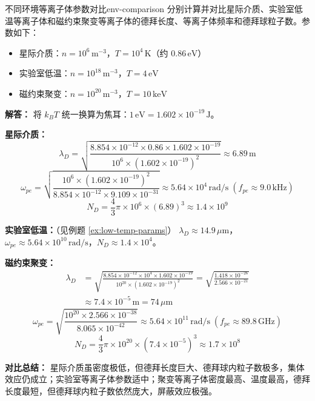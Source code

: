 \begin{example}{不同环境等离子体参数对比}{env-comparison}
分别计算并对比星际介质、实验室低温等离子体和磁约束聚变等离子体的德拜长度、等离子体频率和德拜球粒子数。参数如下：
\begin{itemize}[leftmargin=*,itemsep=0pt]
\item 星际介质：$n = 10^{6}\,\mathrm{m}^{-3}$，$T = 10^{4}\,\mathrm{K}$（约 $0.86\,\mathrm{eV}$）
\item 实验室低温：$n = 10^{18}\,\mathrm{m}^{-3}$，$T = 4\,\mathrm{eV}$
\item 磁约束聚变：$n = 10^{20}\,\mathrm{m}^{-3}$，$T = 10\,\mathrm{keV}$
\end{itemize}
\tcblower
\textbf{解答：}
将 $k_{\!B}T$ 统一换算为焦耳：$1\,\mathrm{eV}=1.602\times 10^{-19}\,\mathrm{J}$。

\textbf{星际介质：}
\[
\lambda_D = \sqrt{\frac{8.854\times 10^{-12}\times 0.86\times 1.602\times 10^{-19}}{10^6\times (1.602\times 10^{-19})^2}} \approx 6.89\,\mathrm{m}
\]
\[
\omega_{pe} = \sqrt{\frac{10^6\times (1.602\times 10^{-19})^2}{8.854\times 10^{-12}\times 9.109\times 10^{-31}}} \approx 5.64\times 10^{4}\,\mathrm{rad/s}\;(f_{pe}\approx 9.0\,\mathrm{kHz})
\]
\[
N_D = \frac{4}{3}\pi\times 10^6\times (6.89)^3 \approx 1.4\times 10^{9}
\]

\textbf{实验室低温：}（见例题 \ref{ex:low-temp-params}）
$\lambda_D\approx 14.9\,\mu\mathrm{m}$，$\omega_{pe}\approx 5.64\times 10^{10}\,\mathrm{rad/s}$，$N_D\approx 1.4\times 10^4$。

\textbf{磁约束聚变：}
\[
\begin{aligned}
\lambda_D &= \sqrt{\frac{8.854\times 10^{-12}\times 10^4\times 1.602\times 10^{-19}}
                        {10^{20}\times (1.602\times 10^{-19})^2}}
          = \sqrt{\frac{1.418\times 10^{-26}}{2.566\times 10^{-21}}} \\
          &\approx 7.4\times 10^{-5}\,\mathrm{m} = 74\,\mu\mathrm{m}
\end{aligned}
\]
\[
\omega_{pe} = \sqrt{\frac{10^{20}\times 2.566\times 10^{-38}}{8.065\times 10^{-42}}} \approx 5.64\times 10^{11}\,\mathrm{rad/s}\;(f_{pe}\approx 89.8\,\mathrm{GHz})
\]
\[
N_D = \frac{4}{3}\pi\times 10^{20}\times (7.4\times 10^{-5})^3 \approx 1.7\times 10^{8}
\]

\textbf{对比总结：} 星际介质虽密度极低，但德拜长度巨大、德拜球内粒子数极多，集体效应仍成立；实验室等离子体参数适中；聚变等离子体密度最高、温度最高，德拜长度最短，但德拜球内粒子数依然庞大，屏蔽效应极强。
\end{example}

